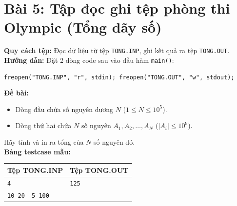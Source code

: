 \documentclass[11pt,a4paper]{article}
\begin{document}
\section*{\color{AsianDarkBlue}Bài 5: Tập đọc ghi tệp phòng thi Olympic (Tổng dãy số)}
\textbf{Quy cách tệp:} Đọc dữ liệu từ tệp \texttt{TONG.INP}, ghi kết quả ra tệp \texttt{TONG.OUT}.\\
\textbf{Hướng dẫn:} Đặt 2 dòng code sau vào đầu hàm \texttt{main()}:
\begin{center}
\texttt{freopen("TONG.INP", "r", stdin); freopen("TONG.OUT", "w", stdout);}
\end{center}
\textbf{Đề bài:} 
\begin{itemize}
    \setlength{\itemsep}{1pt}
    \item Dòng đầu chứa số nguyên dương $N$ ($1 \le N \le 10^5$).
    \item Dòng thứ hai chứa $N$ số nguyên $A_1, A_2, \dots, A_N$ ($|A_i| \le 10^9$).
\end{itemize}
Hãy tính và in ra tổng của $N$ số nguyên đó.\\
\textbf{Bảng testcase mẫu:}
\begin{table}[h!]
\centering\small
\begin{tabular}{|p{7.5cm}|p{7.5cm}|}
\hline
\textbf{Tệp TONG.INP} & \textbf{Tệp TONG.OUT} \\ \hline
\texttt{4} & \texttt{125} \\
\texttt{10 20 -5 100} & \\ \hline
\end{tabular}
\end{table}
\end{document}
